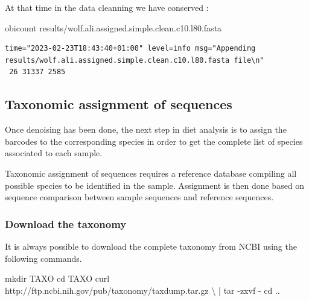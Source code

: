 \documentclass[
  letterpaper,
  DIV=11,
  numbers=noendperiod]{scrreprt}
\newenvironment{Shaded}{\begin{snugshade}}{\end{snugshade}}
\newcommand{\AttributeTok}[1]{\textcolor[rgb]{0.40,0.45,0.13}{#1}}
\newcommand{\BuiltInTok}[1]{\textcolor[rgb]{0.00,0.23,0.31}{#1}}
\newcommand{\DataTypeTok}[1]{\textcolor[rgb]{0.68,0.00,0.00}{#1}}
\newcommand{\ExtensionTok}[1]{\textcolor[rgb]{0.00,0.23,0.31}{#1}}
\newcommand{\FunctionTok}[1]{\textcolor[rgb]{0.28,0.35,0.67}{#1}}
\newcommand{\KeywordTok}[1]{\textcolor[rgb]{0.00,0.23,0.31}{#1}}
\newcommand{\NormalTok}[1]{\textcolor[rgb]{0.00,0.23,0.31}{#1}}
\begin{document}
At that time in the data cleanning we have conserved :

\begin{Shaded}
\begin{Highlighting}[]
\ExtensionTok{obicount}\NormalTok{ results/wolf.ali.assigned.simple.clean.c10.l80.fasta}
\end{Highlighting}
\end{Shaded}

\begin{verbatim}
time="2023-02-23T18:43:40+01:00" level=info msg="Appending results/wolf.ali.assigned.simple.clean.c10.l80.fasta file\n"
 26 31337 2585
\end{verbatim}

\hypertarget{taxonomic-assignment-of-sequences}{%
\subsection{Taxonomic assignment of
sequences}\label{taxonomic-assignment-of-sequences}}

Once denoising has been done, the next step in diet analysis is to
assign the barcodes to the corresponding species in order to get the
complete list of species associated to each sample.

Taxonomic assignment of sequences requires a reference database
compiling all possible species to be identified in the sample.
Assignment is then done based on sequence comparison between sample
sequences and reference sequences.

\hypertarget{download-the-taxonomy}{%
\subsubsection*{Download the taxonomy}\label{download-the-taxonomy}}

It is always possible to download the complete taxonomy from NCBI using
the following commands.

\begin{Shaded}
\begin{Highlighting}[]
\FunctionTok{mkdir}\NormalTok{ TAXO}
\BuiltInTok{cd}\NormalTok{ TAXO}
\ExtensionTok{curl}\NormalTok{ http://ftp.ncbi.nih.gov/pub/taxonomy/taxdump.tar.gz }\DataTypeTok{\textbackslash{}}
   \KeywordTok{|} \FunctionTok{tar} \AttributeTok{{-}zxvf} \AttributeTok{{-}}
\BuiltInTok{cd}\NormalTok{ ..}
\end{Highlighting}
\end{Shaded}
\end{document}
